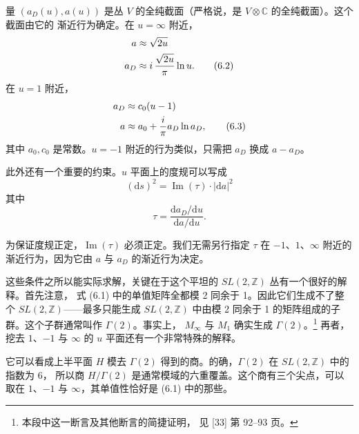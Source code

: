 \documentclass[11pt,a4paper,UTF8,fontset=fandol]{ctexart}
\theoremstyle{plain}
\theoremstyle{definition}
\newcommand{\C}{\mathbb{C}}
\newcommand{\Z}{\mathbb{Z}}
\newcommand{\dd}{\mathrm{d}}
\renewcommand{\Im}{\operatorname{Im}}
\newcommand{\Ff}{\mathcal{F}}
\begin{document}
量 $(a_D(u),a(u))$ 是丛 $V$ 的全纯截面（严格说，是 $V\otimes\C$ 的全纯截面）。这个截面由它的
渐近行为确定。在 $u=\infty$ 附近，
\begin{align}
  a&\approx\sqrt{2u}\notag\\
  a_D&\approx i\,\frac{\sqrt{2u}}{\pi}\ln u. \tag{6.2}
\end{align}
在 $u=1$ 附近，
\begin{align}
  a_D&\approx c_0(u-1)\notag\\
  a&\approx a_0+\frac{i}{\pi}a_D\ln a_D, \tag{6.3}
\end{align}
其中 $a_0,c_0$ 是常数。$u=-1$ 附近的行为类似，只需把 $a_D$ 换成 $a-a_D$。

此外还有一个重要的约束。$u$ 平面上的度规可以写成
\begin{equation}
  (\dd s)^2=\Im(\tau)\cdot|\dd a|^2 \tag{6.4}
\end{equation}
其中
\begin{equation}
  \tau=\frac{\dd a_D/\dd u}{\dd a/\dd u}. \tag{6.5}
\end{equation}

为保证度规正定，$\Im(\tau)$ 必须正定。我们无需另行指定 $\tau$ 在 $-1$、$1$、$\infty$ 附近的
渐近行为，因为它由 $a$ 与 $a_D$ 的渐近行为决定。

这些条件之所以能实际求解，关键在于这个平坦的 $SL(2,\Z)$ 丛有一个很好的解释。首先注意，
式 (6.1) 中的单值矩阵全都模 2 同余于 1。因此它们生成不了整个 $SL(2,\Z)$——最多只能生成
$SL(2,\Z)$ 中由模 2 同余于 1 的矩阵组成的子群。这个子群通常叫作 $\Gamma(2)$。事实上，
$M_\infty$ 与 $M_1$ 确实生成 $\Gamma(2)$。\footnote{本段中这一断言及其他断言的简捷证明，
见 [33] 第 92--93 页。} 再者，挖去 $1$、$-1$ 与 $\infty$ 的 $u$ 平面还有一个非常特殊的解释。

它可以看成上半平面 $H$ 模去 $\Gamma(2)$ 得到的商。的确，$\Gamma(2)$ 在 $SL(2,\Z)$ 中的指数为 6，
所以商 $H/\Gamma(2)$ 是通常模域的六重覆盖。这个商有三个尖点，可以取在 $1$、$-1$ 与
$\infty$，其单值性恰好是 (6.1) 中的那些。
\end{document}
